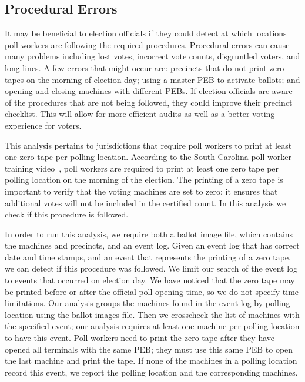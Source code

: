 \subsection{Procedural Errors}
\smvertspace
It may be beneficial to election officials if they could detect at which
locations poll workers are following the required procedures. Procedural errors
can cause many problems including lost votes, incorrect vote counts, disgruntled
voters, and long lines. A few errors that might occur are: precincts that do not
print zero tapes on the morning of election day; using a master PEB to activate
ballots; and opening and closing machines with different PEBs. If election
officials are aware of the procedures that are not being followed, they could
improve their precinct checklist. This will allow for more efficient audits as
well as a better voting experience for voters. 

This analysis pertains to jurisdictions that require poll workers to
print at least one zero tape per polling location.  According to the
South Carolina poll worker training video~\cite{VotingInfo}, poll
workers are required to print at least one zero tape per polling
location on the morning of the election. The printing of a zero tape
is important to verify that the voting machines are set to zero; it
ensures that additional votes will not be included in the certified
count. In this analysis we check if this procedure is followed.

In order to run this analysis, we require both a ballot image file, which contains the machines and precincts, and an event log.  Given an event log that has correct date and time stamps, and an event that represents the printing of a zero tape, we can detect if this procedure was followed.  We limit our search of the event log to events that occurred on election day.  We have noticed that the zero tape may be printed before or after the official poll opening time, so we do not specify time limitations.  Our analysis groups the machines found in the event log by polling location using the ballot images file.  Then we crosscheck the list of machines with the specified event; our analysis requires at least one machine per polling location to have this event.  Poll workers need to print the zero tape after they have opened all terminals with the same PEB; they must use this same PEB to open the last machine and print the tape.  If none of the machines in a polling location record this event, we report the polling location and the corresponding machines.


